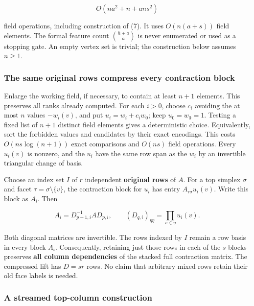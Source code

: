 \[
O(na^2+n+ans^2)
\tag{8}
\]

field operations, including construction of (7). It uses \(O(n(a+s))\) field elements. The formal feature count \(\binom{h+a}{a}\) is never enumerated or used as a stopping gate. An empty vertex set is trivial; the construction below assumes \(n\ge1\).

\hypertarget{af-4b125c3959-the-same-original-rows-compress-every-contraction-block}{%
\subsubsection{The same original rows compress every contraction block}\label{af-4b125c3959-the-same-original-rows-compress-every-contraction-block}}

Enlarge the working field, if necessary, to contain at least \(n+1\) elements. This preserves all ranks already computed. For each \(i>0\), choose \(c_i\) avoiding the at most \(n\) values \(-w_i(v)\), and put \(u_i=w_i+c_iw_0\); keep \(u_0=w_0=1\). Testing a fixed list of \(n+1\) distinct field elements gives a deterministic choice. Equivalently, sort the forbidden values and candidates by their exact encodings. This costs \(O(ns\log(n+1))\) exact comparisons and \(O(ns)\) field operations. Every \(u_i(v)\) is nonzero, and the \(u_i\) have the same row span as the \(w_i\) by an invertible triangular change of basis.

Choose an index set \(I\) of \(r\) independent \textbf{original rows} of \(A\). For a top simplex \(\sigma\) and facet \(\tau=\sigma\setminus\{v\}\), the contraction block for \(u_i\) has entry \(A_{\tau\sigma}u_i(v)\). Write this block as \(A_i\). Then

\[
A_i=D_{p-1,i}^{-1}A D_{p,i},\qquad
 (D_{q,i})_{\eta\eta}=\prod_{v\in\eta}u_i(v).
\tag{9}
\]

Both diagonal matrices are invertible. The rows indexed by \(I\) remain a row basis in every block \(A_i\). Consequently, retaining just those rows in each of the \(s\) blocks preserves \textbf{all column dependencies} of the stacked full contraction matrix. The compressed lift has \(D=sr\) rows. No claim that arbitrary mixed rows retain their old face labels is needed.

\hypertarget{af-4b125c3959-a-streamed-top-column-construction}{%
\subsubsection{A streamed top-column construction}\label{af-4b125c3959-a-streamed-top-column-construction}}

